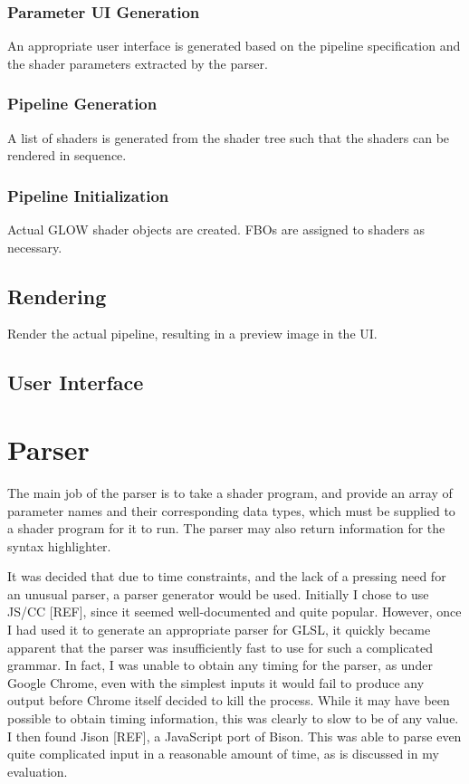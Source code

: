\documentclass[12pt,twoside,notitlepage]{report}
\begin{document}
\subsubsection{Parameter UI Generation}
An appropriate user interface is generated based on the pipeline specification and the shader parameters extracted by the parser.
\subsubsection{Pipeline Generation}
A list of shaders is generated from the shader tree such that the shaders can be rendered in sequence.
\subsubsection{Pipeline Initialization}
Actual GLOW shader objects are created. FBOs are assigned to shaders as necessary.
\subsection{Rendering}
Render the actual pipeline, resulting in a preview image in the UI.
\subsection{User Interface}

\section{Parser}
The main job of the parser is to take a shader program, and provide an array of parameter names and their corresponding data types, which must be supplied to a shader program for it to run. The parser may also return information for the syntax highlighter.

It was decided that due to time constraints, and the lack of a pressing need for an unusual parser, a parser generator would be used. Initially I chose to use JS/CC [REF], since it seemed well-documented and quite popular. However, once I had used it to generate an appropriate parser for GLSL, it quickly became apparent that the parser was insufficiently fast to use for such a complicated grammar. In fact, I was unable to obtain any timing for the parser, as under Google Chrome, even with the simplest inputs it would fail to produce any output before Chrome itself decided to kill the process. While it may have been possible to obtain timing information, this was clearly to slow to be of any value. I then found Jison [REF], a JavaScript port of Bison. This was able to parse even quite complicated input in a reasonable amount of time, as is discussed in my evaluation.
\end{document}
